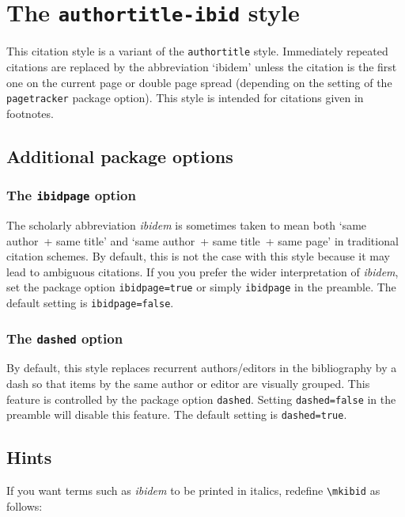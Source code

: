 \documentclass[a4paper]{article}
\newcommand{\cmd}[1]{\texttt{\textbackslash #1}}
\begin{document}
\section*{The \texttt{authortitle-ibid} style}

This citation style is a variant of the \texttt{authortitle} style.
Immediately repeated citations are replaced by the abbreviation
`ibidem' unless the citation is the first one on the current page or
double page spread (depending on the setting of the
\texttt{pagetracker} package option). This style is intended for
citations given in footnotes.

\subsection*{Additional package options}

\subsubsection*{The \texttt{ibidpage} option}

The scholarly abbreviation \emph{ibidem} is sometimes taken to mean
both `same author~+ same title' and `same author~+ same title~+ same
page' in traditional citation schemes. By default, this is not the
case with this style because it may lead to ambiguous citations. If
you you prefer the wider interpretation of \emph{ibidem}, set the
package option \texttt{ibidpage=true} or simply \texttt{ibidpage} in
the preamble. The default setting is \texttt{ibidpage=false}.

\subsubsection*{The \texttt{dashed} option}

By default, this style replaces recurrent authors/editors in the
bibliography by a dash so that items by the same author or editor
are visually grouped. This feature is controlled by the package
option \texttt{dashed}. Setting \texttt{dashed=false} in the
preamble will disable this feature. The default setting is
\texttt{dashed=true}.

\subsection*{Hints}

If you want terms such as \emph{ibidem} to be printed in italics,
redefine \cmd{mkibid} as follows:
\end{document}
